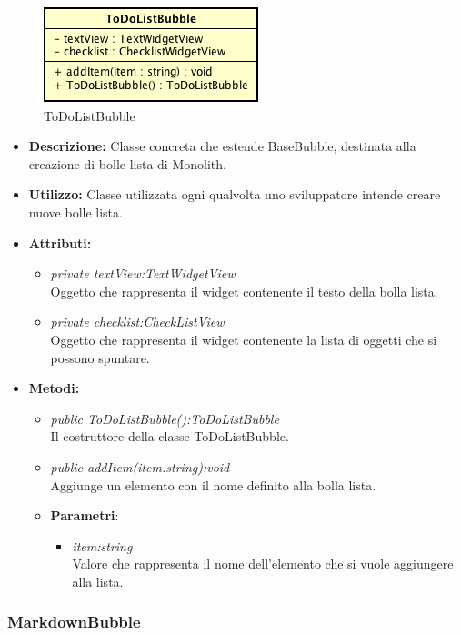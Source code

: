 \label{ToDoListBubble}
\begin{figure}[ht]
	\centering
	\includegraphics[scale=0.5]{Sezioni/SottosezioniST/img/ToDoListBubble.png}
	\caption{ToDoListBubble}
\end{figure}

\begin{itemize}
\item \textbf{Descrizione:} Classe concreta che estende BaseBubble, destinata alla creazione di bolle lista di Monolith.
\item \textbf{Utilizzo:} Classe utilizzata ogni qualvolta uno sviluppatore intende creare nuove bolle lista.
\item \textbf{Attributi:}
\begin{itemize}
\item \textit{private textView:TextWidgetView}\\
Oggetto che rappresenta il widget contenente il testo della bolla lista.
\item \textit{private checklist:CheckListView}\\
Oggetto che rappresenta il widget contenente la lista di oggetti che si possono spuntare.
\end{itemize}
\item \textbf{Metodi:}
\begin{itemize}
\item \textit{public ToDoListBubble():ToDoListBubble}\\
Il costruttore della classe ToDoListBubble.
\item \textit{public addItem(item:string):void}\\
Aggiunge un elemento con il nome definito alla bolla lista.
\item{\textbf{Parametri}: \begin{itemize}
\item \textit{item:string}\\
Valore che rappresenta il nome dell'elemento che si vuole aggiungere alla lista.
\end{itemize}}
\end{itemize}
\end{itemize}

\subsubsection{MarkdownBubble}

